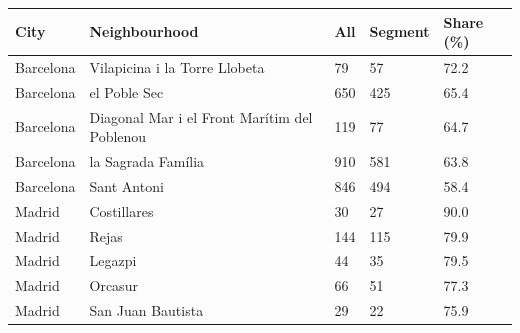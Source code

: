 \begin{tabular}{lllll}
\toprule
City & Neighbourhood & All & Segment & Share (\%) \\
\midrule
Barcelona & Vilapicina i la Torre Llobeta & 79 & 57 & 72.2 \\
Barcelona & el Poble Sec & 650 & 425 & 65.4 \\
Barcelona & Diagonal Mar i el Front Marítim del Poblenou & 119 & 77 & 64.7 \\
Barcelona & la Sagrada Família & 910 & 581 & 63.8 \\
Barcelona & Sant Antoni & 846 & 494 & 58.4 \\
Madrid & Costillares & 30 & 27 & 90.0 \\
Madrid & Rejas & 144 & 115 & 79.9 \\
Madrid & Legazpi & 44 & 35 & 79.5 \\
Madrid & Orcasur & 66 & 51 & 77.3 \\
Madrid & San Juan Bautista & 29 & 22 & 75.9 \\
\bottomrule
\end{tabular}
